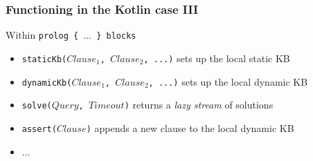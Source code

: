 \documentclass[presentation]{beamer}
\begin{document}
\begin{frame}%
\frametitle{Functioning in the Kotlin case III}

    \begin{block}{Within \texttt{prolog \{ $\ldots$ \} blocks}}
        \begin{itemize}
            \item \alert{\texttt{staticKb($Clause_1$, $Clause_2$, ...)}} sets up the local \alert{static} KB
            \item \alert{\texttt{dynamicKb($Clause_1$, $Clause_2$, ...)}} sets up the local \alert{dynamic} KB
            \item \alert{\texttt{solve($Query$, $Timeout$)}} returns a \emph{lazy stream} of solutions
            \item \alert{\texttt{assert($Clause$)}} appends a new clause to the local \alert{dynamic} KB
            \item $\ldots$
        \end{itemize}
    \end{block}

\end{frame}
\end{document}
